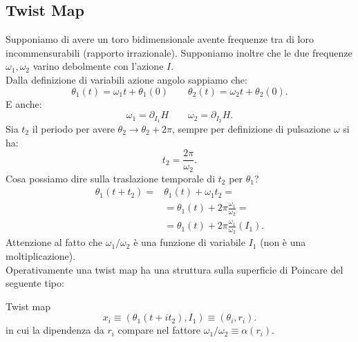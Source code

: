 \subsection{Twist Map}%
\label{sub:Twist Map}
Supponiamo di avere un toro bidimensionale avente frequenze tra di loro incommensurabili (rapporto irrazionale). Supponiamo inoltre che le due frequenze $\omega_1, \omega_2$ varino debolmente con l'azione $I$.\\
Dalla definizione di variabili azione angolo sappiamo che:
\[
    \theta_1(t)=\omega_1t+\theta_1(0) \qquad
    \theta_2(t)=\omega_2t+\theta_2(0)
.\] 
E anche:
\[
    \omega_1 = \partial_{I_1}H \qquad \omega_2 = \partial_{I_2}H
.\] 
Sia $t_2$  il periodo per avere $\theta_2\to \theta_2+2\pi$, sempre per definizione di pulsazione $\omega$ si ha:
\[
    t_2 =  \frac{2\pi}{\omega_2}
.\] 
Cosa possiamo dire sulla traslazione temporale di $t_2$  per $\theta_1$?
\[\begin{aligned}
    \theta_1(t+t_2) =& \theta_1(t)+\omega_1t_2 = \\
		     & = \theta_1(t) + 2\pi\frac{\omega_1}{\omega_2} = \\
		     & =\theta_1(t) + 2\pi  \frac{\omega_1}{\omega_2}(I_1)
.\end{aligned}\]
Attenzione al fatto che $\omega_1/\omega_2$ è una funzione di variabile $I_1$ (non è una moltiplicazione).\\
Operativamente una twist map ha una struttura sulla superficie di Poincare del seguente tipo:
\begin{redbox}{Twist map}
    \[
	x_i \equiv \left(\theta_1(t+it_2), I_1\right) \equiv (\theta_i, r_i)
    .\] 
    in cui la dipendenza da $r_i$ compare nel fattore $\omega_1 /\omega_2 \equiv \alpha (r_i)$.
\end{redbox}
\noindent
